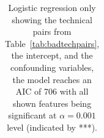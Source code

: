 \begin{table}[t!]
\begin{tabular}{cccc}
%
%
\bottomrule
\end{tabular}
\caption{Logistic regression only showing the technical pairs from Table~\ref{tab:badtechpairs}, the intercept, and the confounding variables, the model reaches an AIC of 706 with all shown features being significant at $\alpha=0.001$ level (indicated by ***).}
\label{tab:regression}
\end{table}





